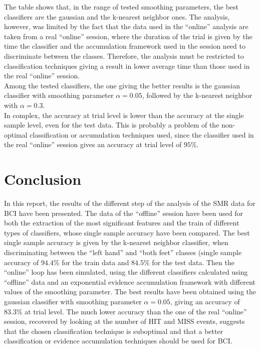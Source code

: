 The table shows that, in the range of tested smoothing parameters, the best classifiers are the gaussian and the k-nearest neighbor ones.
The analysis, however, was limited by the fact that the data used in the ``online'' analysis are taken from a real ``online'' session, where the duration of the trial is given by the time the classifier and the accumulation framework used in the session need to discriminate between the classes.
Therefore, the analysis must be restricted to classification techniques giving a result in lower average time than those used in the real ``online'' session. \\
Among the tested classifiers, the one giving the better results is the gaussian classifier with smoothing parameter $\alpha = 0.05$, followed by the k-nearest neighbor with $\alpha = 0.3$. \\
In complex, the accuracy at trial level is lower than the accuracy at the single sample level, even for the test data.
This is probably a problem of the non-optimal classification or accumulation techniques used, since the classifier used in the real ``online'' session gives an accuracy at trial level of $95\%$.

\section{Conclusion}
In this report, the results of the different step of the analysis of the SMR data for BCI have been presented.
The data of the ``offline'' session have been used for both the extraction of the most significant features and the train of different types of classifiers, whose single sample accuracy have been compared.
The best single sample accuracy is given by the k-nearest neighbor classifier, when discriminating between the ``left hand'' and ``both feet'' classes (single sample accuracy of $94.4\%$ for the train data and $84.5\%$ for the test data.
Then the ``online'' loop has been simulated, using the different classifiers calculated using ``offline'' data and an exponential evidence accumulation framework with different values of the smoothing parameter.
The best results have been obtained using the gaussian classifier with smoothing parameter $\alpha = 0.05$, giving an accuracy of $83.3\%$ at trial level.
The much lower accuracy than the one of the real ``online'' session, recovered by looking at the number of HIT and MISS events, suggests that the chosen classification technique is suboptimal and that a better classification or evidence accumulation techniques should be used for BCI.
